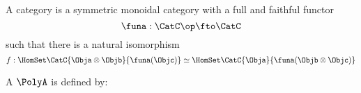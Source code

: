 \begin{definition}
    \label{def:star-autonomous-categor-2y}
    A \starautonomous category is a symmetric monoidal category
    with a full and faithful functor
    \begin{equation}
        \funa: \CatC\op \fto \CatC
    \end{equation}
    such that there is a natural isomorphism
    \begin{equation}
        f : \HomSet\CatC{\Obja \otimes \Objb}{\funa(\Objc)} \simeq \HomSet\CatC{\Obja}{\funa(\Objb \otimes \Objc)}
    \end{equation}
\end{definition}

\begin{ctdefinition}[Polycategory]
    \label{def:polycategory}
    A  $\PolyA$ is defined by:


\end{ctdefinition}
